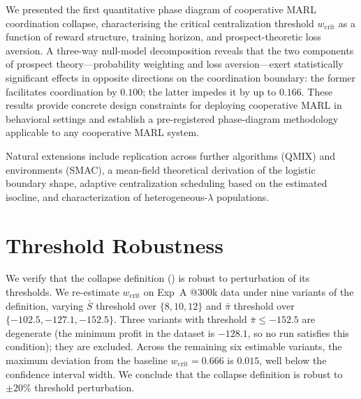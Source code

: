 \documentclass[11pt]{article}
\newcommand{\wcrit}{w_{\mathrm{crit}}}
\begin{document}
We presented the first quantitative phase diagram of cooperative MARL
coordination collapse, characterising the critical centralization threshold
$\wcrit$ as a function of reward structure, training horizon, and
prospect-theoretic loss aversion.
A three-way null-model decomposition reveals that the two components of
prospect theory---probability weighting and loss aversion---exert
statistically significant effects in opposite directions on the
coordination boundary: the former facilitates coordination by $0.100$;
the latter impedes it by up to $0.166$.
These results provide concrete design constraints for deploying cooperative
MARL in behavioral settings and establish a pre-registered phase-diagram
methodology applicable to any cooperative MARL system.

Natural extensions include replication across further algorithms (QMIX) and
environments (SMAC), a mean-field theoretical derivation of the
logistic boundary shape, adaptive centralization scheduling based on the
estimated isocline, and characterization of heterogeneous-$\lambda$
populations.



\appendix

\section{Threshold Robustness}
\label{sec:appendix_robustness}

We verify that the collapse definition () is robust to
perturbation of its thresholds.
We re-estimate $\wcrit$ on Exp~A @300k data under nine variants of the
definition, varying $\bar{S}$ threshold over $\{8, 10, 12\}$ and
$\bar{\pi}$ threshold over $\{-102.5, -127.1, -152.5\}$.
Three variants with threshold $\bar{\pi} \leq -152.5$ are degenerate
(the minimum profit in the dataset is $-128.1$, so no run satisfies
this condition); they are excluded.
Across the remaining six estimable variants, the maximum deviation from
the baseline $\wcrit = 0.666$ is $0.015$, well below the confidence
interval width.
We conclude that the collapse definition is robust to $\pm 20\%$ threshold
perturbation.
\end{document}
